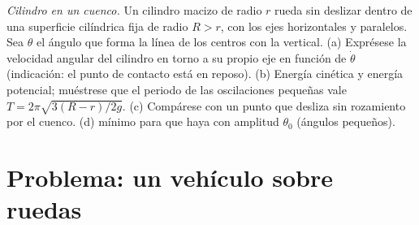 \begin{exercise}[$\star\star\star$]\label{exo:b2:rigid-body-mechanics:12}
\emph{Cilindro en un cuenco.} Un cilindro macizo de radio $r$ rueda sin
deslizar dentro de una superficie cilíndrica fija de radio $R > r$, con
los ejes horizontales y paralelos. Sea $\theta$ el ángulo que forma la
línea de los centros con la vertical. (a) Exprésese la velocidad angular
del cilindro en torno a su propio eje en función de $\dot\theta$
(indicación: el punto de contacto está en reposo). (b) Energía cinética y
energía potencial; muéstrese que el periodo de las oscilaciones pequeñas
vale $T = 2\pi\sqrt{3(R - r)/2g}$. (c) Compárese con un punto que desliza
sin rozamiento por el cuenco. (d)  mínimo para
que haya  con amplitud $\theta_0$ (ángulos pequeños).
\end{exercise}

\section{Problema: un vehículo sobre ruedas}

